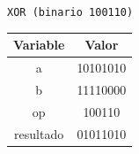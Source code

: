\documentclass[letterpaper]{sae}
\begin{document}
\begin{figure}[H] %
\label{fig:test4}
\end{figure}

\verb+XOR (binario 100110)+\\

\begin{center}
	\begin{tabular}{|c|c|}
		\hline 
		Variable & Valor\tabularnewline
		\hline 
		\hline 
		a & 10101010\tabularnewline
		\hline 
		b & 11110000\tabularnewline
		\hline 
		op & 100110\tabularnewline
		\hline 
		resultado & 01011010\tabularnewline
		\hline 
	\end{tabular}
\end{center}
\end{document}
